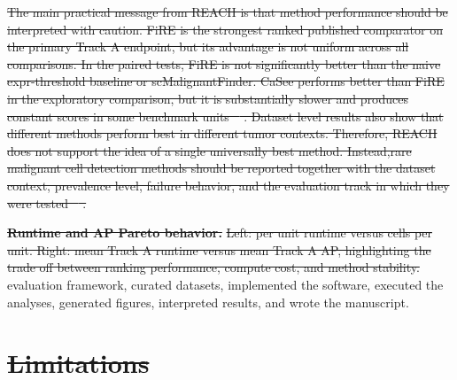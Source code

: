 \documentclass[10pt]{article}
\providecommand{\DIFaddtex}[1]{{\protect\color{trackgreen}#1}} %
\providecommand{\DIFdeltex}[1]{{\protect\color{red}\sout{#1}}}                      %
\providecommand{\DIFaddbegin}{} %
\providecommand{\DIFaddend}{} %
\providecommand{\DIFdelbegin}{} %
\providecommand{\DIFdelend}{} %
\providecommand{\DIFdelFL}[1]{\DIFdel{#1}} %
\providecommand{\DIFadd}[1]{\texorpdfstring{\DIFaddtex{#1}}{#1}} %
\providecommand{\DIFdel}[1]{\texorpdfstring{\DIFdeltex{#1}}{}} %
\newcommand{\DIFscaledelfig}{0.5}
\newlength{\DIFdelgraphicswidth} %
\newlength{\DIFdelgraphicsheight} %
\newcommand{\DIFaddincludegraphics}[2][]{{\color{trackgreen}\fbox{\DIFOincludegraphics[#1]{#2}}}} %
\newcommand{\DIFdelincludegraphics}[2][]{%
\sbox{\DIFdelgraphicsbox}{\DIFOincludegraphics[#1]{#2}}%
\settoboxwidth{\DIFdelgraphicswidth}{\DIFdelgraphicsbox} %
\settoboxtotalheight{\DIFdelgraphicsheight}{\DIFdelgraphicsbox} %
\scalebox{\DIFscaledelfig}{%
\parbox[b]{\DIFdelgraphicswidth}{\usebox{\DIFdelgraphicsbox}\\[-\baselineskip] \rule{\DIFdelgraphicswidth}{0em}}\llap{\resizebox{\DIFdelgraphicswidth}{\DIFdelgraphicsheight}{%
\setlength{\unitlength}{\DIFdelgraphicswidth}%
\begin{picture}(1,1)%
\thicklines\linethickness{2pt} %
{\color[rgb]{1,0,0}\put(0,0){\framebox(1,1){}}}%
{\color[rgb]{1,0,0}\put(0,0){\line( 1,1){1}}}%
{\color[rgb]{1,0,0}\put(0,1){\line(1,-1){1}}}%
\end{picture}%
}\hspace*{3pt}}} %
} %
\DeclareRobustCommand{\DIFaddbegin}{\DIFOaddbegin \let\includegraphics\DIFaddincludegraphics} %
\DeclareRobustCommand{\DIFaddend}{\DIFOaddend \let\includegraphics\DIFOincludegraphics} %
\DeclareRobustCommand{\DIFdelbegin}{\DIFOdelbegin \let\includegraphics\DIFdelincludegraphics} %
\DeclareRobustCommand{\DIFdelend}{\DIFOaddend \let\includegraphics\DIFOincludegraphics} %
\begin{document}
\DIFdel{The main practical message from REACH is that method performance should be interpreted with caution. FiRE is the
  strongest ranked published comparator on the primary Track A endpoint, but its advantage is not uniform across all comparisons. In the paired tests, FiRE is not significantly better than the naive expr-threshold baseline or scMalignantFinder. CaSee performs better than FiRE in the exploratory comparison, but it is substantially slower and produces constant scores in some benchmark units \mbox{%
\cite{sh2022casee,yu2025scmalignantfinder}}\hskip0pt%
. Dataset level results also show that different methods perform best in different tumor contexts. Therefore, REACH does not support the idea of a single universally best method. Instead,rare malignant cell detection methods should be reported together with
  the dataset context, prevalence level, failure behavior, and the evaluation track in which they were tested \mbox{%
\cite{peng2019single,qian2020pan,tirosh2024cancer}}\hskip0pt%
. }%

{%
\textbf{\DIFdelFL{Runtime and AP Pareto behavior.}} %
\DIFdelFL{Left: per unit
runtime versus cells per unit. Right: mean Track A runtime versus mean
Track A AP, highlighting the trade off between ranking performance,
compute cost, and method stability.}}
\DIFdelend \DIFaddbegin \DIFadd{evaluation framework,
curated datasets, implemented the software, executed the analyses,
generated figures, interpreted results, and wrote the manuscript.
}\DIFaddend 

\DIFdelbegin \section{\DIFdel{Limitations}}
\addtocounter{section}{-1}%
\DIFdelend \DIFaddbegin \begin{center}\DIFadd{\rule{0.5\linewidth}{0.5pt}}\end{center}
\DIFaddend 
\end{document}
